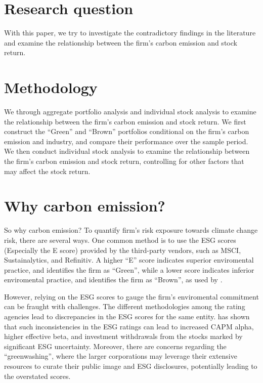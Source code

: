 \documentclass[12pt]{article}
\begin{document}
\section{Research question}
With this paper, we try to investigate the contradictory findings in the literature and examine the relationship between the firm's carbon emission and stock return.

\section{Methodology}
We through aggregate portfolio analysis and individual stock analysis to examine the relationship between the firm's carbon emission and stock return. We first construct the ``Green'' and ``Brown'' portfolios conditional on the firm's carbon emission and industry, and compare their performance over the sample period. We then conduct individual stock analysis to examine the relationship between the firm's carbon emission and stock return, controlling for other factors that may affect the stock return.

\section{Why carbon emission?}
So why carbon emission? To quantify firm's risk exposure towards climate change risk, there are several ways. One common method is to use the ESG scores (Especially the E score) provided by the third-party vendors, such as MSCI, Sustainalytics, and Refinitiv. A higher ``E'' score indicates superior enviromental practice, and identifies the firm as ``Green'', while a lower score indicates inferior enviromental practice, and identifies the firm as ``Brown'', as used by \cite{pastor2022dissecting}.

However, relying on the ESG scores to gauge the firm's enviromental commitment can be fraught with challenges. The different methodologies among the rating agencies lead to discrepancies in the ESG scores for the same entity. \cite{avramov2022sustainable} has shown that such inconsistencies in the ESG ratings can lead to increased CAPM alpha, higher effective beta, and investment withdrawals from the stocks marked by significant ESG uncertainty. Moreover, there are concerns regarding the ``greenwashing'', where the larger corporations may leverage their extensive resources to curate their public image and ESG disclosures, potentially leading to the overstated scores.
\end{document}
